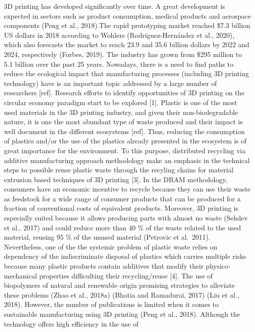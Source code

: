 \documentclass[]{elsarticle} %
\begin{document}
3D printing has developed significantly over time. A great development
is expected in sectors such as product consumption, medical products and
aerospace components (Peng et al., 2018).The rapid prototyping market
reached \$7.3 billion US dollars in 2018 according to Wohlers
(Rodriguez-Hernández et al., 2020), which also forecasts the market to
reach 23.9 and 35.6 billion dollars by 2022 and 2024, respectively
(Forbes, 2019). The industry has grown from \$295 million to 5.1 billion
over the past 25 years. Nowadays, there is a need to find paths to
reduce the ecological impact that manufacturing processes (including 3D
printing technology) have is an important topic addressed by a large
number of researchers {[}ref{]}. Research efforts to identify
opportunities of 3D printing on the circular economy paradigm start to
be explored {[}1{]}. Plastic is one of the most used materials in the 3D
printing industry, and given their non-biodegradable nature, it is one
the most abundant type of waste produced and their impact is well
document in the different ecosystems {[}ref{]}. Thus, reducing the
consumption of plastics and/or the use of the plastics already presented
in the ecosystem is of great importance for the environment. To this
purpose, distributed recycling via additive manufacturing approach
methodology make an emphasis in the technical steps to possible reuse
plastic waste through the recyling chains for material extrusion based
techniques of 3D printing {[}3{]}. In the DRAM methodology, consumers
have an economic incentive to recycle because they can use their waste
as feedstock for a wide range of consumer products that can be produced
for a fraction of conventional costs of equivalent products. Moreover,
3D printing is especially suited because it allows producing parts with
almost no waste (Sehdev et al., 2017) and could reduce more than 40 \%
of the waste related to the used material, reusing 95 \% of the unused
material (Petrovic et al.~2011). Nevertheless, one of the the systemic
problem of plastic waste relies on dependency of the indiscriminate
disposal of plastics which carries multiple risks because many plastic
products contain additives that modify their physico-mechanical
properties difficulting their recycling/reuse {[}4{]}. The use of
biopolymers of natural and renewable origin promising strategies to
alleviate these problems (Zhao et al., 2018a) (Bhatia and Ramadurai,
2017) (Liu et al., 2018). However, the number of publications is limited
when it comes to sustainable manufacturing using 3D printing (Peng et
al., 2018). Although the technology offers high efficiency in the use of
\end{document}

